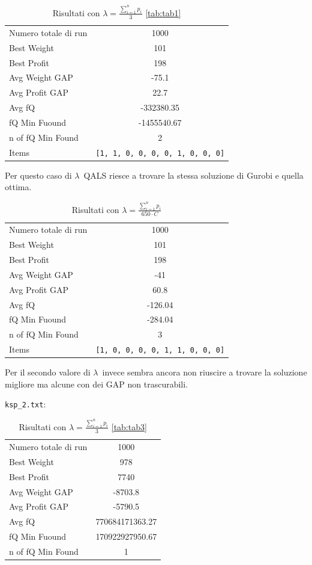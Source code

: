 \documentclass[a4paper,12pt]{article}
\begin{document}
\begin{table}[H]
\centering
\begin{tabular}{lc}
\toprule
Numero totale di run & 1000 \\
Best Weight & 101 \\
Best Profit & 198 \\
Avg Weight GAP & -75.1 \\
Avg Profit GAP & 22.7 \\
Avg fQ & -332380.35 \\
fQ Min Fuound & -1455540.67 \\
n of fQ Min Found & 2 \\
Items & \texttt{[1, 1, 0, 0, 0, 0, 1, 0, 0, 0]} \\
\bottomrule
\end{tabular}
\caption{Risultati con $\lambda = \displaystyle \frac{\sum_{i=1}^{n} p_i}{3}$ \ref{tab:tab1}}
\end{table}

Per questo caso di $\lambda$\ QALS riesce a trovare la stessa soluzione di Gurobi e quella ottima.

\begin{table}[H]
\centering
\begin{tabular}{lc}
\toprule
Numero totale di run & 1000 \\
Best Weight & 101 \\
Best Profit & 198 \\
Avg Weight GAP & -41 \\
Avg Profit GAP & 60.8 \\
Avg fQ & -126.04 \\
fQ Min Fuound & -284.04 \\
n of fQ Min Found & 3 \\
Items & \texttt{[1, 0, 0, 0, 0, 1, 1, 0, 0, 0]} \\
\bottomrule
\end{tabular}
\caption{Risultati con $\lambda = \displaystyle \frac{\sum_{i=1}^{n} p_i}{650 \cdot C}$}
\end{table}

Per il secondo valore di $\lambda$\ invece sembra ancora non riuscire a trovare la soluzione migliore
ma alcune con dei GAP non trascurabili.


\texttt{ksp\_2.txt}:

\begin{table}[H]
\centering
\begin{tabular}{lc}
\toprule
Numero totale di run & 1000 \\
Best Weight & 978 \\
Best Profit & 7740 \\
Avg Weight GAP & -8703.8 \\
Avg Profit GAP & -5790.5 \\
Avg fQ & 770684171363.27 \\
fQ Min Fuound & 170922927950.67 \\
n of fQ Min Found & 1 \\
\bottomrule
\end{tabular}
\caption{Risultati con $\lambda = \displaystyle \frac{\sum_{i=1}^{n} p_i}{3}$ \ref{tab:tab3}}
\end{table}
\end{document}
